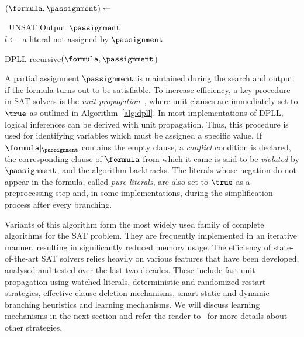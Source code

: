 \begin{algorithm}[htp]%
    \SetAlgoLined\DontPrintSemicolon%
    $(\formula, \passignment) \leftarrow$ \proc{$\formula,\passignment$}

    {\Return~UNSAT}
    {Output $\passignment$\\
    }
    $l \leftarrow$ a literal not assigned by $\passignment$

    {}

    \vspace{2mm}
    \setcounter{AlgoLine}{0}
    \caption{DPLL-recursive$(\formula, \passignment$)}%
    \label{alg:dpll}
\end{algorithm} 

A partial assignment $\passignment$ is maintained during the search and output if the
formula turns out to be satisfiable.  To increase efficiency, a key procedure in SAT
solvers is the \emph{unit propagation}~\cite{cdclchapter}, where unit clauses
are immediately set to $\true$ as outlined in Algorithm~\ref{alg:dpll}. In most
implementations of DPLL, logical inferences can be derived with unit propagation.
Thus, this procedure is used for identifying variables which must be assigned
a specific value. If $\formula |_\passignment$ contains the empty clause, a
\emph{conflict} condition is declared, the corresponding clause of $\formula$
from which it came is said to be \emph{violated} by $\passignment$, and the algorithm
backtracks. The literals whose negation do not appear in the formula, called
\emph{pure literals}, are also set to $\true$ as a preprocessing step and, in
some implementations, during the simplification process after every branching. 

Variants of this algorithm form the most widely used family of complete
algorithms for the SAT problem. They are frequently implemented in an iterative
manner, resulting in significantly reduced memory usage. The efficiency of
state-of-the-art SAT solvers relies heavily on various features that have been
developed, analysed and tested over the last two decades. These include fast
unit propagation using watched literals, deterministic and randomized restart
strategies, effective clause deletion mechanisms, smart static and dynamic
branching heuristics and learning mechanisms. We will discuss learning
mechanisms in the next section and refer the reader to~\cite{satchapter} for
more details about other strategies.

